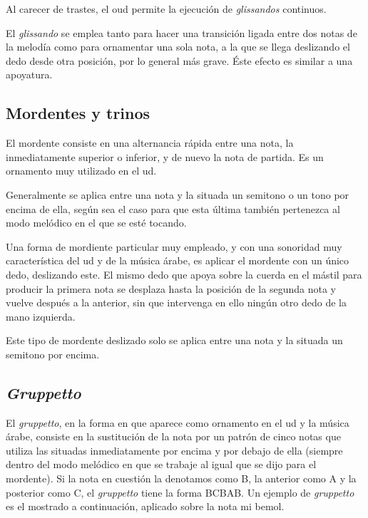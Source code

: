 Al carecer de trastes, el oud permite la ejecución de \emph{glissandos} continuos.

El \emph{glissando} se emplea tanto para hacer una transición ligada entre dos notas de la melodía como para ornamentar una sola nota, a la que se llega deslizando el dedo desde otra posición, por lo general más grave. Éste efecto es similar a una apoyatura.


\subsection{Mordentes y trinos}

El mordente consiste en una alternancia rápida entre una nota, la inmediatamente superior o inferior, y de nuevo la nota de partida. Es un ornamento muy utilizado en el ud.

Generalmente se aplica entre una nota y la situada un semitono o un tono por encima de ella, según sea el caso para que esta última también pertenezca al modo melódico en el que se esté tocando.


Una forma de mordiente particular muy empleado, y con una sonoridad muy característica del ud y de la música árabe, es aplicar el mordente con un único dedo, deslizando este. El mismo dedo que apoya sobre la cuerda en el mástil para producir la primera nota se desplaza hasta la posición de la segunda nota y vuelve después a la anterior, sin que intervenga en ello ningún otro dedo de la mano izquierda.


Este tipo de mordente deslizado solo se aplica entre una nota y la situada un semitono por encima.

\subsection{\emph{Gruppetto}}

El \emph{gruppetto}, en la forma en que aparece como ornamento en el ud y la música árabe, consiste en la sustitución de la nota por un patrón de cinco notas que utiliza las situadas inmediatamente por encima y por debajo de ella (siempre dentro del modo melódico en que se trabaje al igual que se dijo para el mordente). Si la nota en cuestión la denotamos como B, la anterior como A y la posterior como C, el \emph{gruppetto} tiene la forma BCBAB. Un ejemplo de \emph{gruppetto} es el mostrado a continuación, aplicado sobre la nota mi bemol.

